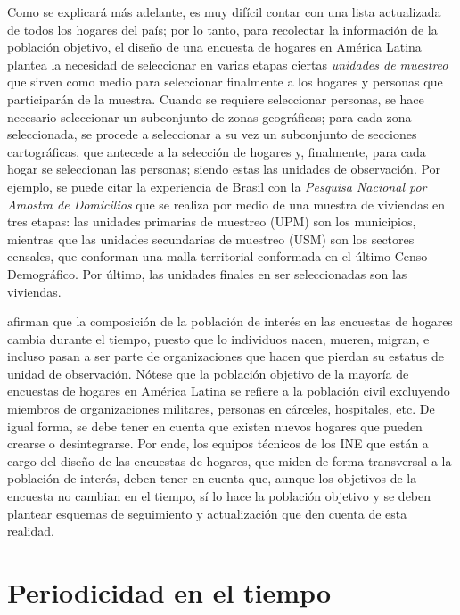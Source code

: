 Como se explicará más adelante, es muy difícil contar con una lista actualizada de todos los hogares del país; por lo tanto, para recolectar la información de la población objetivo, el diseño de una encuesta de hogares en América Latina plantea la necesidad de seleccionar en varias etapas ciertas \emph{unidades de muestreo} que sirven como medio para seleccionar finalmente a los hogares y personas que participarán de la muestra. Cuando se requiere seleccionar personas, se hace necesario seleccionar un subconjunto de zonas geográficas; para cada zona seleccionada, se procede a seleccionar a su vez un subconjunto de secciones cartográficas, que antecede a la selección de hogares y, finalmente, para cada hogar se seleccionan las personas; siendo estas las unidades de observación. Por ejemplo, se puede citar la experiencia de Brasil con la \emph{Pesquisa Nacional por Amostra de Domicilios} que se realiza por medio de una muestra de viviendas en tres etapas: las unidades primarias de muestreo (UPM) son los municipios, mientras que las unidades secundarias de muestreo (USM) son los sectores censales, que conforman una malla territorial conformada en el último Censo Demográfico. Por último, las unidades finales en ser seleccionadas son las viviendas.

\citet[pág. 105]{Duncan_Kalton_1987} afirman que la composición de la población de interés en las encuestas de hogares cambia durante el tiempo, puesto que lo individuos nacen, mueren, migran, e incluso pasan a ser parte de organizaciones que hacen que pierdan su estatus de unidad de observación. Nótese que la población objetivo de la mayoría de encuestas de hogares en América Latina se refiere a la población civil excluyendo miembros de organizaciones militares, personas en cárceles, hospitales, etc. De igual forma, se debe tener en cuenta que existen nuevos hogares que pueden crearse o desintegrarse. Por ende, los equipos técnicos de los INE que están a cargo del diseño de las encuestas de hogares, que miden de forma transversal a la población de interés, deben tener en cuenta que, aunque los objetivos de la encuesta no cambian en el tiempo, sí lo hace la población objetivo y se deben plantear esquemas de seguimiento y actualización que den cuenta de esta realidad.

\hypertarget{periodicidad-en-el-tiempo}{%
\section{Periodicidad en el tiempo}\label{periodicidad-en-el-tiempo}}

